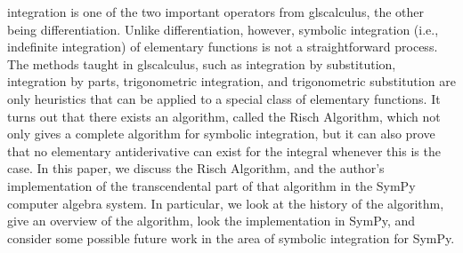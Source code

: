 \Gls{integration} is one of the two important operators from gls{calculus},
the other being \gls{differentiation}.  Unlike \gls{differentiation},
however, symbolic \gls{integration} (i.e., indefinite \gls{integration})
of \gls{elementary} functions is not a straightforward process. The
methods taught in gls{calculus}, such as \gls{integration} by substitution,
\gls{integration} by parts, trigonometric \gls{integration}, and
trigonometric substitution are only heuristics that can be applied to a
special class of \gls{elementary} functions. It turns out that there
exists an algorithm, called the Risch Algorithm, which not only gives a
complete algorithm for symbolic \gls{integration}, but it can also prove
that no \gls{elementary} antiderivative can exist for the integral
whenever this is the case. In this paper, we discuss the Risch
Algorithm, and the author's implementation of the \gls{transcendental}
part of that algorithm in the SymPy computer algebra system.  In
particular, we look at the history of the algorithm, give an overview of
the algorithm, look the implementation in SymPy, and consider some
possible future work in the area of symbolic \gls{integration} for
SymPy.
